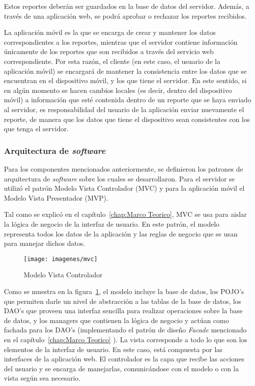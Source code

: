 Estos reportes deberán ser guardados en la base de datos del servidor. Además, a través de una aplicación web, se podrá aprobar o rechazar los reportes recibidos.

La aplicación móvil es la que se encarga de crear y mantener los datos correspondientes a los reportes, mientras que el servidor contiene información únicamente de los reportes que son recibidos a través del servicio web correspondiente. Por esta razón, el cliente (en este caso, el usuario de la aplicación móvil) se encargará de mantener la consistencia entre los datos que se encuentran en el dispositivo móvil, y los que tiene el servidor. En este sentido, si en algún momento se hacen cambios locales (es decir, dentro del dispositivo móvil) a información que esté contenida dentro de un reporte que se haya enviado al servidor, es responsabilidad del usuario de la aplicación enviar nuevamente el reporte, de manera que los datos que tiene el dispositivo sean consistentes con los que tenga el servidor.

\subsubsection{Arquitectura de \textit{software}}

Para los componentes mencionados anteriormente, se definieron los patrones de arquitectura de \textit{software} sobre los cuales se desarrollaron. Para el servidor se utilizó el patrón Modelo Vista Controlador (MVC) y para la aplicación móvil el Modelo Vista Presentador (MVP).

Tal como se explicó en el capítulo~\ref{chap:Marco Teorico}, MVC se usa para aislar la lógica de negocio de la interfaz de usuario. En este patrón, el modelo representa todos los datos de la aplicación y las reglas de negocio que se usan para manejar dichos datos. 
\begin{figure}[ht]
  \centering
  \texttt{[image: imagenes/mvc]}
  \caption{Modelo Vista Controlador}
  \label{fig:mvc}
\end{figure}

Como se muestra en la figura~\ref{fig:mvc}, el modelo incluye la base de datos, los POJO's que permiten darle un nivel de abstracción a las tablas de la base de datos, los DAO's que proveen una interfaz sencilla para realizar operaciones sobre la base de datos, y los managers que contienen la lógica de negocio y actúan como fachada para los DAO's (implementando el patrón de diseño \textit{Facade} mencionado en el capítulo~\ref{chap:Marco Teorico} ). La vista corresponde a todo lo que son los elementos de la interfaz de usuario. En este caso, está compuesta por las interfaces de la aplicación web. El controlador es la capa que recibe las acciones del usuario y se encarga de manejarlas, comunicándose con el modelo o con la vista según sea necesario.

